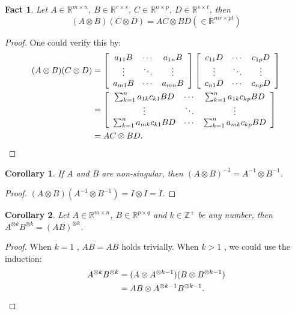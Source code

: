 \documentclass{article}
\newtheorem{fact}{Fact}[section]
\newtheorem{corollary}{Corollary}[section]
\begin{document}
\begin{fact}
  Let $A \in \mathbb{R}^{m \times n}$, $B \in \mathbb{R}^{r\times s}$, $C \in \mathbb{R}^{n\times p}$, $D\in\mathbb{R}^{s\times t}$, then
  \[(A\otimes B)(C\otimes D) = AC\otimes BD (\in \mathbb{R}^{mr \times pt})\]
\end{fact}
\begin{proof}
  One could verify this by:
  \begin{align*}
    (A\otimes B)(C\otimes D)
    &= \left[
      \begin{array}{ccc}
        a_{11}B & \cdots & a_{1n}B \\
        \vdots & \ddots & \vdots \\
        a_{m1}B & \cdots & a_{mn}B
      \end{array} \right] 
      \left[
      \begin{array}{ccc}
          c_{11}D & \cdots & c_{1p}D \\
          \vdots & \ddots & \vdots \\
          c_{n1}D & \cdots & c_{np}D
      \end{array} \right]  \\
    &= \left[
      \begin{array}{ccc}
        \sum_{k=1}^n a_{1k}c_{k1}BD & \cdots & \sum_{k=1}^na_{1k}c_{kp}BD \\
        \vdots & \ddots & \vdots \\
        \sum_{k=1}^n a_{mk}c_{k1}BD & \cdots & \sum_{k=1}^n a_{mk}c_{kp}BD
      \end{array}
      \right] \\
    &= AC \otimes BD . \qedhere
  \end{align*}
\end{proof}

\begin{corollary}
  If $A$ and $B$ are non-singular, then $(A\otimes B)^{-1} = A^{-1}\otimes B^{-1}$.
\end{corollary}
\begin{proof}
  $(A\otimes B)(A^{-1}\otimes B^{-1}) = I\otimes I = I$.
\end{proof}

\begin{corollary}
  Let $A \in \mathbb{R}^{m\times n}$, $B \in \mathbb{R}^{p\times q}$ and $k \in \mathbb{Z}^+$ be any number, then $A^{\otimes k} B^{\otimes k} = (AB)^{\otimes k}$.
\end{corollary}
\begin{proof}
  When $k = 1$ , $AB = AB$ holds trivially.
  When $k > 1$ , we could use the induction:
  \begin{align*}
    A^{\otimes k}B^{\otimes k} &= (A \otimes A^{\otimes k-1})(B \otimes B^{\otimes k-1}) \\
    &= AB \otimes A^{\otimes k-1}B^{\otimes k-1}. \qedhere
  \end{align*}
\end{proof}
\end{document}
